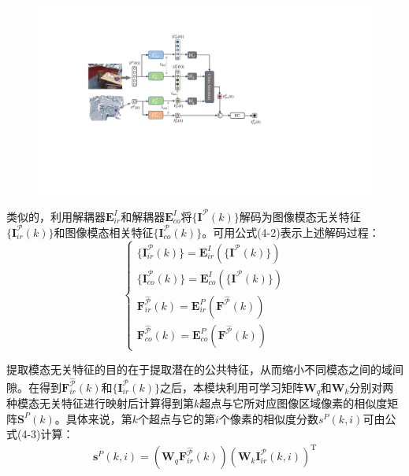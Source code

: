     \vspace{-0.1cm}
    \begin{figure}[ht]
        \centering
        \includegraphics[width = \textwidth]{my/figure/4-3.pdf}
        \label{fig:4-3}
    \end{figure}
    \vspace{-0.35cm}

    类似的，利用解耦器$\mathbf{E}^{I}_{ir}$和解耦器$\mathbf{E}^{I}_{co}$将$\{\mathbf{I}^{\mathcal{P}}(k)\}$解码为图像模态无关特征$\{\mathbf{I}^{\mathcal{P}}_{ir}(k)\}$和图像模态相关特征$\{\mathbf{I}^{\mathcal{P}}_{co}(k)\}$。可用公式(4-2)表示上述解码过程：
    \begin{equation}
        \left\{
        \begin{aligned}
            \{{\mathbf{I}^{\mathcal{P}}_{ir}(k)}\} = \mathbf{E}^{I}_{ir}(\{\mathbf{I}^{\mathcal{P}}(k)\}) \\
            \{{\mathbf{I}^{\mathcal{P}}_{co}(k)}\} = \mathbf{E}^{I}_{co}(\{\mathbf{I}^{\mathcal{P}}(k)\}) \\
            \mathbf{F}^{\hat{\mathcal{P}}}_{ir}(k) = \mathbf{E}^{P}_{ir}(\mathbf{F}^{\hat{\mathcal{P}}}(k)) \\
            \mathbf{F}^{\hat{\mathcal{P}}}_{co}(k) = \mathbf{E}^{P}_{co}(\mathbf{F}^{\hat{\mathcal{P}}}(k))
        \end{aligned} \right.
    \end{equation}

    提取模态无关特征的目的在于提取潜在的公共特征，从而缩小不同模态之间的域间隙。在得到$\mathbf{F}^{\hat{\mathcal{P}}}_{ir}(k)$和$\{\mathbf{I}^{\mathcal{P}}_{ir}(k)\}$之后，本模块利用可学习矩阵$\mathbf{W}_q$和$\mathbf{W}_k$分别对两种模态无关特征进行映射后计算得到第$k$超点与它所对应图像区域像素的相似度矩阵$\mathbf{S}^{P}(k)$。具体来说，第$k$个超点与它的第$i$个像素的相似度分数$s^{P}(k,i)$可由公式(4-3)计算：
    \begin{equation}
        \begin{aligned}
            \mathbf{s}^{P}(k,i) = 
            (\mathbf{W}_q \mathbf{F}^{\hat{\mathcal{P}}}_{ir}(k))
            (\mathbf{W}_k \mathbf{I}^{\mathcal{P}}_{ir}(k,i))^\mathrm{T}
        \end{aligned}
    \end{equation}
    
